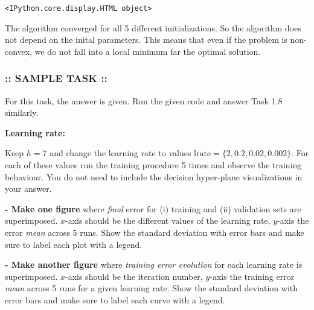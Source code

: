 \documentclass[11pt]{article}
\begin{document}
    
    \begin{verbatim}
<IPython.core.display.HTML object>
    \end{verbatim}

    
    The algorithm converged for all 5 different initializations. So the
algorithm does not depend on the inital parameters. This means that even
if the problem is non-convex, we do not fall into a local minimum far
the optimal solution.

    \hypertarget{sample-task}{%
\subsubsection{:: SAMPLE TASK ::}\label{sample-task}}

For this task, the answer is given. Run the given code and answer Task
1.8 similarly.

\textbf{Learning rate:}

Keep \(h=7\) and change the learning rate to values
\(\text{lrate} = \{2, 0.2, 0.02, 0.002\}\). For each of these values run
the training procedure 5 times and observe the training behaviour. You
do not need to include the decision hyper-plane visualizations in your
answer.

\textbf{- Make one figure} where \emph{final} error for (i) training and
(ii) validation sets are superimposed. \(x\)-axis should be the
different values of the learning rate, \(y\)-axis the error \emph{mean}
across 5 runs. Show the standard deviation with error bars and make sure
to label each plot with a legend.

\textbf{- Make another figure} where \emph{training error evolution} for
each learning rate is superimposed. \(x\)-axis should be the iteration
number, \(y\)-axis the training error \emph{mean} across 5 runs for a
given learning rate. Show the standard deviation with error bars and
make sure to label each curve with a legend.
\end{document}
